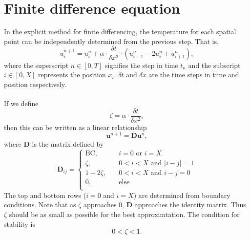\documentclass[letterpaper,titlepage,oneside]{report}
\begin{document}
\section*{Finite difference equation}
In the explicit method for finite differencing, the temperature for
each spatial point can be independently determined from the previous
step. That is,
\begin{equation}\label{eq:explicit}
  u_i^{n+1} = u_i^n + \alpha\cdot\frac{\delta t}{\delta x^2}\cdot
  \left(u_{i-1}^n - 2u_i^n + u_{i+1}^n\right),
\end{equation}
where the superscript $n \in [0, T]$ signifies the step in time
$t_n$ and the
subscript $i \in [0, X]$ represents the position
$x_i$. $\delta t$ and $\delta x$
are the time steps in time and position respectively.
\\\\
If we define
\begin{equation*}
  \zeta = \alpha\cdot\frac{\delta t}{\delta x^2},
\end{equation*}
then this can be written as a linear relationship
\begin{equation}\label{eq:explicitlinear}
  \mathbf{u}^{n+1} = \mathbf{D}\mathbf{u}^{n},
\end{equation}
where $\mathbf{D}$ is the matrix defined by
\begin{equation}\label{eq:explicitdmatrix}
  \mathbf{D}_{ij} = 
  \begin{cases}
    \text{BC}, & \quad i=0 \text{ or } i=X \\
    \zeta,     & \quad 0<i<X \text{ and } |i-j|=1 \\
    1-2\zeta,  & \quad 0<i<X \text{ and } i-j=0 \\
    0,         & \quad \text{else} \\
  \end{cases}
\end{equation}
The top and bottom rows ($i=0$ and $i=X$) are determined from
boundary conditions. Note that as $\zeta$ approaches $0$,
$\mathbf{D}$ approaches the identity matrix. Thus $\zeta$ should be
as small as possible for the best approximtation. The condition for
stability is
\begin{equation*}
  0<\zeta<1.
\end{equation*}
\end{document}
